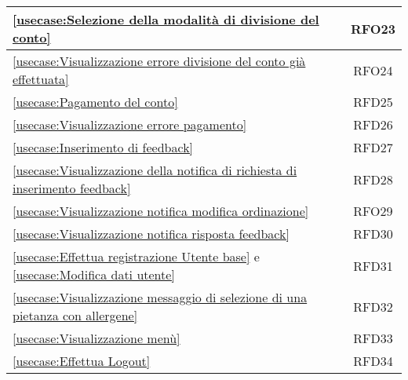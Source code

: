 \begin{longtable}{|l|c|}
	\hline
	\autoref{usecase:Selezione della modalità di divisione del conto}                                                                                            & RFO23                  \\
	\hline
	\autoref{usecase:Visualizzazione errore divisione del conto già effettuata}                                                                                  & RFO24                  \\
	\hline
	\autoref{usecase:Pagamento del conto}                                                                                                                        & RFD25                  \\
	\hline
	\autoref{usecase:Visualizzazione errore pagamento}                                                                                                           & RFD26                  \\
	\hline
	\autoref{usecase:Inserimento di feedback}                                                                                                                    & RFD27                  \\
	\hline
	\autoref{usecase:Visualizzazione della notifica di richiesta di inserimento feedback}                                                                        & RFD28                  \\
	\hline
	\autoref{usecase:Visualizzazione notifica modifica ordinazione}                                                                                              & RFO29                  \\
	\hline
	\autoref{usecase:Visualizzazione notifica risposta feedback}                                                                                                 & RFD30                  \\
	\hline
	\autoref{usecase:Effettua registrazione Utente base} e \autoref{usecase:Modifica dati utente}                                                                & RFD31                  \\
	\hline
	\autoref{usecase:Visualizzazione messaggio di selezione di una pietanza con allergene}                                                                       & RFD32                  \\
	\hline
	\autoref{usecase:Visualizzazione menù}                                                                                                                       & RFD33                  \\
	\hline
	\autoref{usecase:Effettua Logout}                                                                                                                            & RFD34                  \\

\end{longtable}
